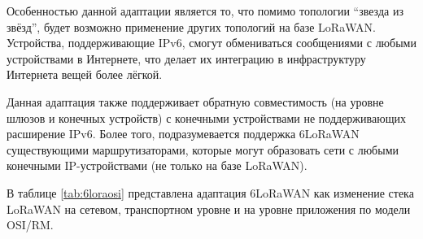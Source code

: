 Особенностью данной адаптации является то, что помимо топологии ``звезда из 
звёзд'', будет возможно применение других топологий на базе 
LoRaWAN\texttrademark.
Устройства, поддерживающие IPv6, смогут обмениваться сообщениями с любыми 
устройствами в Интернете, что делает их интеграцию в инфраструктуру Интернета 
вещей более лёгкой.

Данная адаптация также поддерживает обратную совместимость (на уровне шлюзов и 
конечных устройств) с конечными устройствами не поддерживающих расширение IPv6.
Более того, подразумевается поддержка 6LoRaWAN существующими 
маршрутизаторами, которые могут образовать сети с любыми конечными 
IP-устройствами (не только на базе LoRaWAN\texttrademark).

В таблице \ref{tab:6loraosi} представлена адаптация 6LoRaWAN как изменение 
стека LoRaWAN на сетевом, транспортном уровне и на уровне приложения по модели 
OSI/RM.


